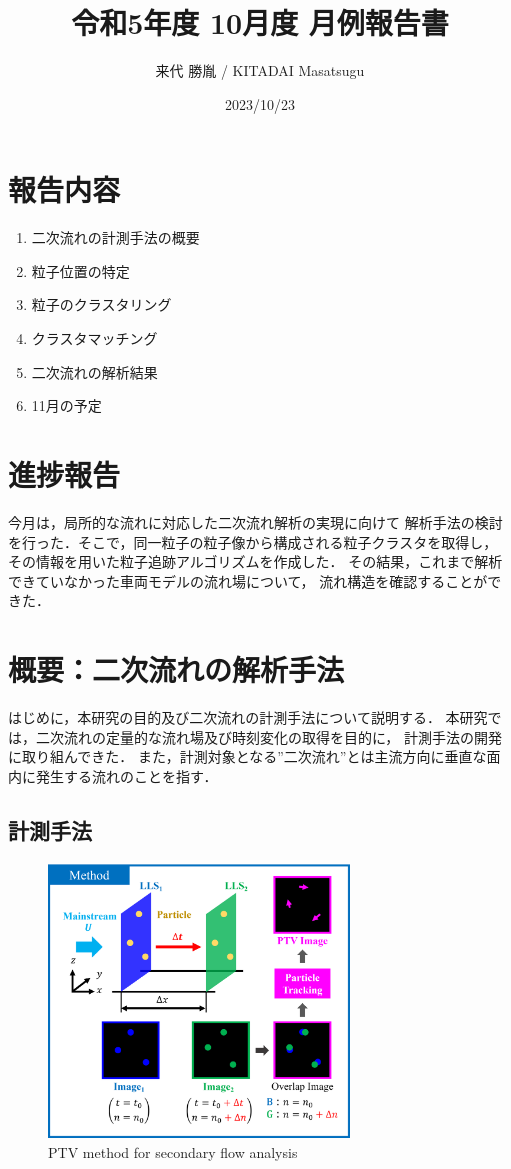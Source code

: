 \documentclass[twocolumn,a4j]{jsarticle}
\author{来代 勝胤 / KITADAI Masatsugu}
\title{令和5年度 10月度 月例報告書}
\date{2023/10/23}
\begin{document}
\columnseprule=0.1mm
\maketitle

\section*{報告内容}
\begin{enumerate}[1.]
	\item 二次流れの計測手法の概要
	\item 粒子位置の特定
	\item 粒子のクラスタリング
	\item クラスタマッチング
	\item 二次流れの解析結果
	\item 11月の予定
\end{enumerate}

\section*{進捗報告}
今月は，局所的な流れに対応した二次流れ解析の実現に向けて
解析手法の検討を行った．そこで，同一粒子の粒子像から構成される粒子クラスタを取得し，
その情報を用いた粒子追跡アルゴリズムを作成した．
その結果，これまで解析できていなかった車両モデルの流れ場について，
流れ構造を確認することができた．

\section{概要：二次流れの解析手法}
はじめに，本研究の目的及び二次流れの計測手法について説明する．
本研究では，二次流れの定量的な流れ場及び時刻変化の取得を目的に，
計測手法の開発に取り組んできた．
また，計測対象となる”二次流れ”とは主流方向に垂直な面内に発生する流れのことを指す．

\subsection{計測手法}
\begin{figure}[htbp]
	\centering
	\includegraphics[keepaspectratio, width=80mm]{../images/method.png}
	\caption{PTV method for secondary flow analysis}
\end{figure}
\end{document}
